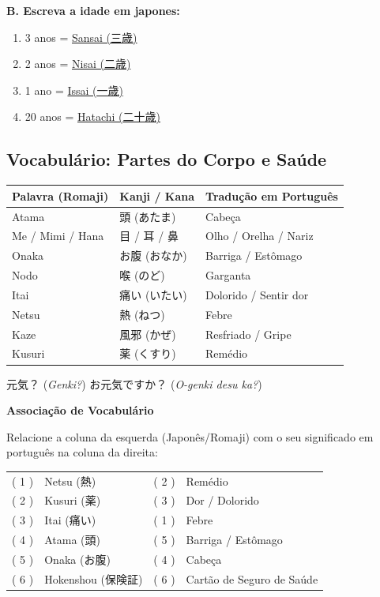 \documentclass[12pt,a4paper]{article}
\begin{document}
\textbf{B. Escreva a idade em japones:} 
\begin{enumerate}[label=\arabic*.]
    \item 3 anos = \underline{Sansai (三歳)} 
    \item 2 anos = \underline{Nisai (二歳)} 
    \item 1 ano = \underline{Issai (一歳)} 
    \item 20 anos = \underline{Hatachi (二十歳)} 
\end{enumerate}

\newpage
\subsection*{Vocabulário: Partes do Corpo e Saúde}

\vspace{0.2cm}


\begin{tabularx}{\textwidth}{l X X}
\toprule
Palavra (Romaji) & Kanji / Kana & Tradução em Português \\
\midrule
Atama & 頭 (あたま) & Cabeça \\
Me / Mimi / Hana & 目 / 耳 / 鼻 & Olho / Orelha / Nariz \\
Onaka & お腹 (おなか) & Barriga / Estômago \\
Nodo & 喉 (のど) & Garganta \\
Itai & 痛い (いたい) & Dolorido / Sentir dor \\
Netsu & 熱 (ねつ) & Febre \\
Kaze & 風邪 (かぜ) & Resfriado / Gripe \\
Kusuri & 薬 (くすり) & Remédio \\
\bottomrule
\end{tabularx}
元気？ (\textit{Genki?}) 
お元気ですか？ (\textit{O-genki desu ka?})

\vspace{0.4cm}

\textbf{ Associação de Vocabulário}

\small
Relacione a coluna da esquerda (Japonês/Romaji) com o seu significado em português na coluna da direita:

\vspace{0.2cm}


\begin{tabularx}{\textwidth}{l X c X}
( 1 ) & Netsu (熱) & ( 2 ) & Remédio \\
( 2 ) & Kusuri (薬) & ( 3 ) & Dor / Dolorido \\
( 3 ) & Itai (痛い) & ( 1 ) & Febre \\
( 4 ) & Atama (頭) & ( 5 ) & Barriga / Estômago \\
( 5 ) & Onaka (お腹) & ( 4 ) & Cabeça \\
( 6 ) & Hokenshou (保険証) & ( 6 ) & Cartão de Seguro de Saúde \\
\end{tabularx}
\end{document}
